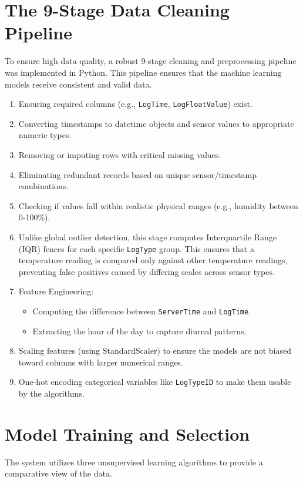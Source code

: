 \section{The 9-Stage Data Cleaning Pipeline}
To ensure high data quality, a robust 9-stage cleaning and preprocessing pipeline was implemented in Python. This pipeline ensures that the machine learning models receive consistent and valid data.

\begin{enumerate}
    \item Ensuring required columns (e.g., \texttt{LogTime}, \texttt{LogFloatValue}) exist.
    \item Converting timestamps to datetime objects and sensor values to appropriate numeric types.
    \item Removing or imputing rows with critical missing values.
    \item Eliminating redundant records based on unique sensor/timestamp combinations.
    \item Checking if values fall within realistic physical ranges (e.g., humidity between 0-100\%).
    \item Unlike global outlier detection, this stage computes Interquartile Range (IQR) fences for each specific \texttt{LogType} group. This ensures that a temperature reading is compared only against other temperature readings, preventing false positives caused by differing scales across sensor types.
    \item Feature Engineering:
    \begin{itemize}
        \item Computing the difference between \texttt{ServerTime} and \texttt{LogTime}.
        \item Extracting the hour of the day to capture diurnal patterns.
    \end{itemize}
    \item Scaling features (using StandardScaler) to ensure the models are not biased toward columns with larger numerical ranges.
    \item One-hot encoding categorical variables like \texttt{LogTypeID} to make them usable by the algorithms.
\end{enumerate}

\section{Model Training and Selection}
The system utilizes three unsupervised learning algorithms to provide a comparative view of the data. 

